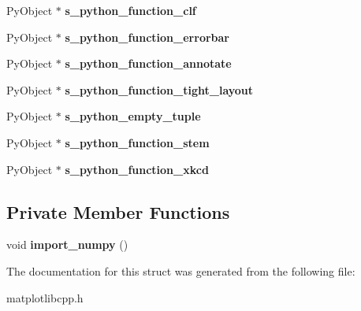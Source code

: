 \begin{DoxyCompactItemize}
Py\+Object $\ast$ {\bfseries s\+\_\+python\+\_\+function\+\_\+clf}
\item 
\mbox{\label{structmatplotlibcpp_1_1detail_1_1__interpreter_a082b7b746d5ebe138b1a136944d0a4ca}} 
Py\+Object $\ast$ {\bfseries s\+\_\+python\+\_\+function\+\_\+errorbar}
\item 
\mbox{\label{structmatplotlibcpp_1_1detail_1_1__interpreter_af63d49cff0820f3324b12da812c9a266}} 
Py\+Object $\ast$ {\bfseries s\+\_\+python\+\_\+function\+\_\+annotate}
\item 
\mbox{\label{structmatplotlibcpp_1_1detail_1_1__interpreter_a72965ea88b282bf62b41ca126341d9a8}} 
Py\+Object $\ast$ {\bfseries s\+\_\+python\+\_\+function\+\_\+tight\+\_\+layout}
\item 
\mbox{\label{structmatplotlibcpp_1_1detail_1_1__interpreter_aaedba936be3a7e8fbcc528991ccace2c}} 
Py\+Object $\ast$ {\bfseries s\+\_\+python\+\_\+empty\+\_\+tuple}
\item 
\mbox{\label{structmatplotlibcpp_1_1detail_1_1__interpreter_a37ac2b6b54f49af43a82115e0d752f98}} 
Py\+Object $\ast$ {\bfseries s\+\_\+python\+\_\+function\+\_\+stem}
\item 
\mbox{\label{structmatplotlibcpp_1_1detail_1_1__interpreter_ac94dda0fc02bf1c7c4af3759c46ea8d7}} 
Py\+Object $\ast$ {\bfseries s\+\_\+python\+\_\+function\+\_\+xkcd}
\end{DoxyCompactItemize}
\subsection*{Private Member Functions}
\begin{DoxyCompactItemize}
\item 
\mbox{\label{structmatplotlibcpp_1_1detail_1_1__interpreter_acedcb567c71193a9d2b40e6d27490794}} 
void {\bfseries import\+\_\+numpy} ()
\end{DoxyCompactItemize}


The documentation for this struct was generated from the following file\+:\begin{DoxyCompactItemize}
\item 
matplotlibcpp.\+h\end{DoxyCompactItemize}
